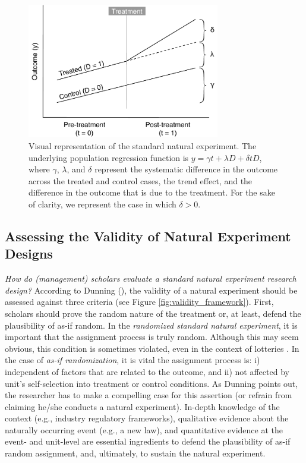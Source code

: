 \documentclass[nobib]{tufte-handout}
\begin{document}
\begin{refsection}
\begin{figure}[]
    \centering
    \includegraphics[width=0.75\textwidth]{exhibits/ne_logic_viz.pdf}
    \caption{Visual representation of the standard natural experiment. 
        The underlying population regression function is $y = \gamma t +
        \lambda D + \delta t D$, where $\gamma$, $\lambda$, and $\delta$ represent 
        the systematic difference in the outcome across the treated and control 
        cases, the trend effect, and the difference in the outcome that is due to
        the treatment. For the sake of clarity, we represent the case in which
        $\delta > 0$.}
    \label{fig:ne_logic_viz}
\end{figure}

\subsection{Assessing the Validity of Natural Experiment Designs}
\label{sub:validity_framework}

\emph{How do (management) scholars evaluate a standard natural experiment research
design?} According to Dunning (\cite*[][page 27]{Dunning2012}), the validity of
a natural experiment should be assessed against three criteria (see Figure
\ref{fig:validity_framework}).  First, scholars should prove the random
nature of the treatment or, at least, defend the plausibility of as-if random.
In the \emph{randomized standard natural experiment}, it is
important that the assignment process is truly random. Although this may seem
obvious, this condition is sometimes violated, even in the context of lotteries
\parencite[e.g.,][]{Starr1997}. In the case of \emph{as-if randomization}, it
is vital the assignment process is: i) independent of
factors that are related to the outcome, and ii) not affected by unit's
self-selection into treatment or control conditions. As Dunning points out, the
researcher has to make a compelling case for this assertion (or refrain from
claiming he/she conducts a natural experiment). In-depth knowledge of the context (e.g.,
industry regulatory frameworks), qualitative evidence about the naturally
occurring event (e.g., a new law), and quantitative evidence at the event- and
unit-level are essential ingredients to defend the plausibility of
as-if random assignment, and, ultimately, to sustain the natural experiment.


\end{refsection}
\end{document}
